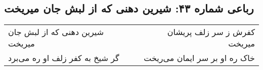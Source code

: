 \begin{center}
\section*{رباعی شماره ۴۳: شیرین دهنی که از لبش جان میریخت}
\label{sec:sh043}
\begin{longtable}{l p{0.5cm} r}
شیرین دهنی که از لبش جان میریخت
&&
کفرش ز سر زلف پریشان میریخت
\\
گر شیخ به کفر زلف او ره می‌برد
&&
خاک ره او بر سر ایمان می‌ریخت
\\
\end{longtable}
\end{center}
